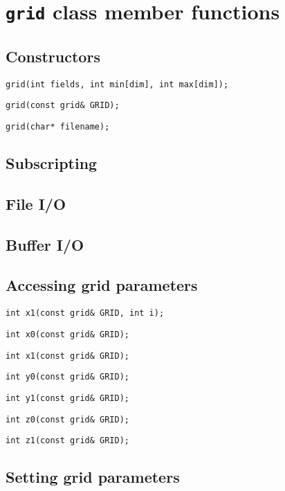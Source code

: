 \section{{\tt grid} class member functions}



\subsection{Constructors}


{\tt grid(int fields, int min[dim], int max[dim]);}

{\tt grid(const grid\& GRID);}

{\tt grid(char* filename);}


\subsection{Subscripting}


\subsection{File I/O}

\subsection{Buffer I/O}


\subsection{Accessing grid parameters}


{\tt int x1(const grid\& GRID, int i);}

{\tt int x0(const grid\& GRID);}

{\tt int x1(const grid\& GRID);}

{\tt int y0(const grid\& GRID);}

{\tt int y1(const grid\& GRID);}

{\tt int z0(const grid\& GRID);}

{\tt int z1(const grid\& GRID);}


\subsection{Setting grid parameters}


